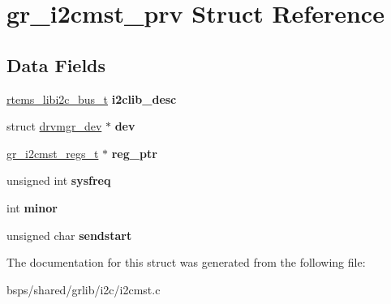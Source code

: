\hypertarget{structgr__i2cmst__prv}{}\section{gr\+\_\+i2cmst\+\_\+prv Struct Reference}
\label{structgr__i2cmst__prv}
\subsection*{Data Fields}
\begin{DoxyCompactItemize}
\item 
\mbox{\label{structgr__i2cmst__prv_a9fd34f1958a3469461066cd2d3c722f1}} 
\mbox{\hyperlink{structrtems__libi2c__bus__t__}{rtems\+\_\+libi2c\+\_\+bus\+\_\+t}} {\bfseries i2clib\+\_\+desc}
\item 
\mbox{\label{structgr__i2cmst__prv_a19287b101fbdfc31f420d2e138ad511e}} 
struct \mbox{\hyperlink{structdrvmgr__dev}{drvmgr\+\_\+dev}} $\ast$ {\bfseries dev}
\item 
\mbox{\label{structgr__i2cmst__prv_af937045e6a4c4bfc2a8f0edcf71dcc2d}} 
\mbox{\hyperlink{structgr__i2cmst__regs}{gr\+\_\+i2cmst\+\_\+regs\+\_\+t}} $\ast$ {\bfseries reg\+\_\+ptr}
\item 
\mbox{\label{structgr__i2cmst__prv_aaaed1b5d7837d5014972b5ff9bf5ba39}} 
unsigned int {\bfseries sysfreq}
\item 
\mbox{\label{structgr__i2cmst__prv_a8ecdfbb367b9b55a6fd2437d0f2df960}} 
int {\bfseries minor}
\item 
\mbox{\label{structgr__i2cmst__prv_a01704691954955bfe775b14de7159971}} 
unsigned char {\bfseries sendstart}
\end{DoxyCompactItemize}


The documentation for this struct was generated from the following file\+:\begin{DoxyCompactItemize}
\item 
bsps/shared/grlib/i2c/i2cmst.\+c\end{DoxyCompactItemize}
